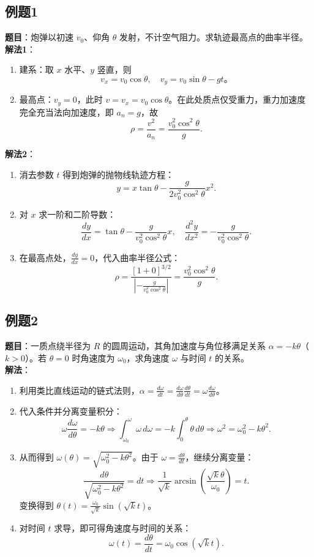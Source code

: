 \documentclass[UTF8]{ctexart}
\begin{document}
	\subsection*{例题1}
	\textbf{题目}：炮弹以初速 $v_0$、仰角 $\theta$ 发射，不计空气阻力。求轨迹最高点的曲率半径。\\
	\textbf{解法1}：
	\begin{enumerate}
		\item 建系：取 $x$ 水平、$y$ 竖直，则
		\[
		v_x = v_0\cos\theta,\quad v_y = v_0\sin\theta - gt。
		\]
		\item 最高点：$v_y = 0$，此时 $v = v_x = v_0\cos\theta$。在此处质点仅受重力，重力加速度完全充当法向加速度，即 $a_n = g$，故
		\[
		\rho = \frac{v^2}{a_n} = \frac{v_0^2\cos^2\theta}{g}.
		\]
	\end{enumerate}
	\textbf{解法2}：
	\begin{enumerate}
		\item 消去参数 $t$ 得到炮弹的抛物线轨迹方程：
		\[
		y = x\tan\theta - \frac{g}{2v_0^2\cos^2\theta}x^2.
		\]
		\item 对 $x$ 求一阶和二阶导数：
		\[
		\frac{dy}{dx} = \tan\theta - \frac{g}{v_0^2\cos^2\theta}x,\quad \frac{d^2y}{dx^2} = -\frac{g}{v_0^2\cos^2\theta}.
		\]
		\item 在最高点处，$\frac{dy}{dx} = 0$，代入曲率半径公式：
		\[
		\rho = \frac{[1 + 0]^{3/2}}{\left|-\frac{g}{v_0^2\cos^2\theta}\right|} = \frac{v_0^2\cos^2\theta}{g}.
		\]
	\end{enumerate}
	
	\subsection*{例题2}
	\textbf{题目}：一质点绕半径为 $R$ 的圆周运动，其角加速度与角位移满足关系 $\alpha = -k\theta$（$k>0$）。若 $\theta=0$ 时角速度为 $\omega_0$，求角速度 $\omega$ 与时间 $t$ 的关系。\\
	\textbf{解法}：
	\begin{enumerate}
		\item 利用类比直线运动的链式法则，$\alpha = \frac{d\omega}{dt} = \frac{d\omega}{d\theta}\frac{d\theta}{dt} = \omega\frac{d\omega}{d\theta}$。
		\item 代入条件并分离变量积分：
		\[
		\omega\frac{d\omega}{d\theta} = -k\theta \Rightarrow \int_{\omega_0}^{\omega} \omega\,d\omega = -k\int_{0}^{\theta} \theta\,d\theta \Rightarrow \omega^2 = \omega_0^2 - k\theta^2.
		\]
		\item 从而得到 $\omega(\theta) = \sqrt{\omega_0^2 - k\theta^2}$。由于 $\omega = \frac{d\theta}{dt}$，继续分离变量：
		\[
		\frac{d\theta}{\sqrt{\omega_0^2 - k\theta^2}} = dt \Rightarrow \frac{1}{\sqrt{k}}\arcsin\left(\frac{\sqrt{k}\theta}{\omega_0}\right) = t.
		\]
		变换得到 $\theta(t) = \frac{\omega_0}{\sqrt{k}}\sin(\sqrt{k}t)$。
		\item 对时间 $t$ 求导，即可得角速度与时间的关系：
		\[
		\omega(t) = \frac{d\theta}{dt} = \omega_0\cos(\sqrt{k}t).
		\]
	\end{enumerate}
	
\end{document}
